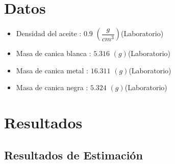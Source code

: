 \documentclass[12pt,a4paper]{config/myConfig}
\begin{document}

\section{Datos}
\label{sec:DATOS}

\begin{itemize}[label=$\rightarrow$, left=0pt]
 \item Densidad del aceite : $0.9$ $\left( \dfrac{g} {cm^{3}} \right)$\hfill(Laboratorio)
 \item Masa de canica blanca : $5.316$  $\left( g \right)$\hfill(Laboratorio)
 \item Masa de canica metal : $16.311$  $\left( g \right)$\hfill(Laboratorio)
 \item Masa de canica negra : $5.324$  $\left( g \right)$\hfill(Laboratorio)
  
\end{itemize}


\section{Resultados}
\label{sec:RESULTADOS}


\subsection*{Resultados de Estimación}
\end{document}
